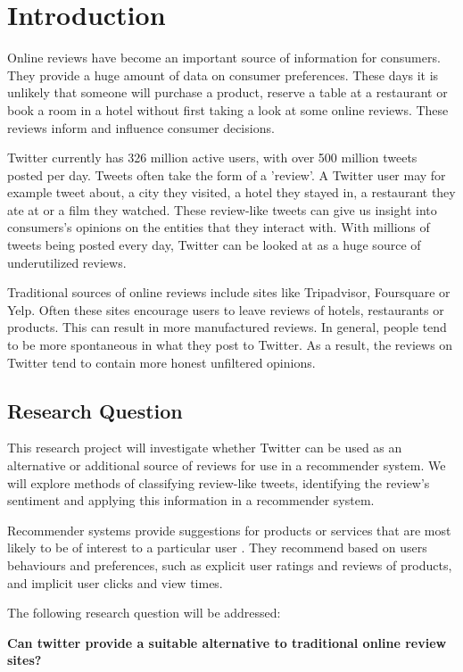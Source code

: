 \chapter{Introduction}
Online reviews have become an important source of information for consumers. They provide a huge amount of data on consumer preferences. These days it is unlikely that someone will purchase a product, reserve a table at a restaurant or book a room in a hotel without first taking a look at some online reviews. These reviews inform and influence consumer decisions.

Twitter currently has 326 million active users, with over 500 million tweets posted per day. Tweets often take the form of a 'review'. A Twitter user may for example tweet about, a city they visited, a hotel they stayed in, a restaurant they ate at or a film they watched. These review-like tweets can give us insight into consumers’s opinions on the entities that they interact with. With millions of tweets being posted every day, Twitter can be looked at as a huge source of underutilized reviews.

Traditional sources of online reviews include sites like Tripadvisor, Foursquare or Yelp. Often these sites encourage users to leave reviews of hotels, restaurants or products. This can result in more manufactured reviews. In general, people tend to be more spontaneous in what they post to Twitter. As a result, the reviews on Twitter tend to contain more honest unfiltered opinions. 

\section{Research Question}
This research project will investigate whether Twitter can be used as an alternative or additional source of reviews for use in a recommender system. We will explore methods of classifying review-like tweets, identifying the review's sentiment and applying this information in a recommender system.

Recommender systems provide suggestions for products or services that are most likely to be of interest to a particular user \cite{Ricci2015}. They recommend based on users behaviours and preferences, such as explicit user ratings and reviews of products, and implicit user clicks and view times.

The following research question will be addressed:

\textbf{Can twitter provide a suitable alternative to traditional online review sites?}\\

